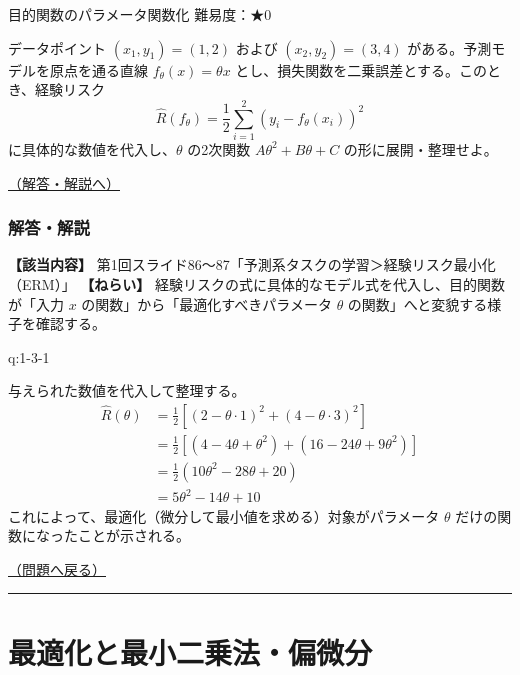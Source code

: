 \begin{questionbox}[label=q:1-3-1]{目的関数のパラメータ関数化 \hfill \normalfont \small 難易度：★0}

データポイント \((x_1, y_1) = (1, 2)\) および \((x_2, y_2) = (3, 4)\)
がある。予測モデルを原点を通る直線 \(f_\theta(x) = \theta x\)
とし、損失関数を二乗誤差とする。このとき、経験リスク \[
\hat{R}(f_\theta) = \frac{1}{2} \sum_{i=1}^2 (y_i - f_\theta(x_i))^2
\] に具体的な数値を代入し、\(\theta\) の2次関数
\(A\theta^2 + B\theta + C\) の形に展開・整理せよ。

\hfill 

\hyperref[a:1-3-1]{（解答・解説へ）}

\end{questionbox}

\subsubsection{解答・解説}\label{ux89e3ux7b54ux89e3ux8aac-2}

\textbf{【該当内容】}
第1回スライド86〜87「予測系タスクの学習＞経験リスク最小化（ERM）」
\textbf{【ねらい】}
経験リスクの式に具体的なモデル式を代入し、目的関数が「入力 \(x\)
の関数」から「最適化すべきパラメータ \(\theta\)
の関数」へと変貌する様子を確認する。

\begin{answerbox}[phantomlabel=a:1-3-1]{q:1-3-1}

与えられた数値を代入して整理する。 \begin{align*}
\hat{R}(\theta) &= \frac{1}{2} \left[ (2 - \theta \cdot 1)^2 + (4 - \theta \cdot 3)^2 \right] \\
&= \frac{1}{2} \left[ (4 - 4\theta + \theta^2) + (16 - 24\theta + 9\theta^2) \right] \\
&= \frac{1}{2} (10\theta^2 - 28\theta + 20) \\
&= 5\theta^2 - 14\theta + 10
\end{align*}
これによって、最適化（微分して最小値を求める）対象がパラメータ
\(\theta\) だけの関数になったことが示される。

\hfill 

\hyperref[q:1-3-1]{（問題へ戻る）}

\begin{center}\rule{0.5\linewidth}{0.5pt}\end{center}

\end{answerbox}

\section{最適化と最小二乗法・偏微分}\label{ux6700ux9069ux5316ux3068ux6700ux5c0fux4e8cux4e57ux6cd5ux504fux5faeux5206}

